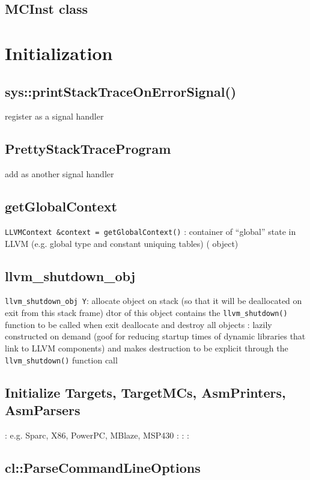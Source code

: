 \documentclass{myproc}
\begin{document}
\subsection{MCInst class}



\section{Initialization}
\subsection{sys::printStackTraceOnErrorSignal()}
\bit
\w register  as a signal handler
\eit
\subsection{PrettyStackTraceProgram}
\bit
\w add  as another signal handler
\eit
\subsection{getGlobalContext}
\bit
\w \verb+LLVMContext &context = getGlobalContext()+
\w {}: container of ``global'' state in LLVM (e.g. global type
and constant uniquing tables) ( object)
\eit

\subsection{llvm\_shutdown\_obj}
\bit
\w \verb+llvm_shutdown_obj Y+: allocate object on stack (so that it will be
deallocated on exit from this stack frame)
\w dtor of this object contains the \verb+llvm_shutdown()+ function to be
called when exit
   \bit
   \w deallocate and destroy all  objects 
   \eit
\w {}:  lazily constructed on demand (goof for reducing
   startup times of dynamic libraries that link to LLVM components) and makes
   destruction to be explicit through the \verb+llvm_shutdown()+ function call
\eit

\subsection{Initialize Targets, TargetMCs, AsmPrinters, AsmParsers}
\bit
\w {}:
  \bit
  \w e.g. Sparc, X86, PowerPC, MBlaze, MSP430
  \eit
\w {}:
\w {}:
\w {}:
\eit

\subsection{cl::ParseCommandLineOptions}
\end{document}
